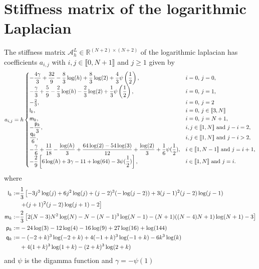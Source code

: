 \documentclass[11 pt]{article}
\newcommand\inter[1]{\llbracket #1\rrbracket}
\numberwithin{equation}{section}
\def\R{\mathbb{R}}
\begin{document}
\section{Stiffness matrix of the logarithmic Laplacian}\label{sec:s:m:log}

The stiffness matrix $\mathcal A_{h}^{L}\in{\R^{(N+2)\times(N+2)}}$ of the logarithmic laplacian has coefficients $a_{i,j}$ with $i,j\in\inter{0,N+1}$ and $j\geq 1$ given by
%
\begin{equation}
a_{i,j}= h
\begin{cases}
\displaystyle -\frac{4 \gamma }{3}+\frac{32 }{9}-\frac{8}{3}  \log (h)+\frac{8}{3}  \log
   (2)+\frac{4}{3}  \psi \left(\frac{1}{2}\right), & \textnormal{$i=0$, $j=0$,} \\ 
\displaystyle -\frac{\gamma }{3}+\frac{5}{9}-\frac{2}{3} \log (h)-\frac{2}{3}  \log
   (2)+\frac{1}{3} \psi \left(\frac{1}{2}\right), & \textnormal{$i=0$, $j=1$,} \\
   -\frac{2}{3}, 
 & \parbox[t]{.3\columnwidth}{$i=0$, $j=2$}\\
 \mathsf{l}_k, 
 & \parbox[t]{.3\columnwidth}{$i=0$, $j\in\inter{3,N}$}\\
 \mathsf{m}_k, &  \parbox[t]{.3\columnwidth}{$i=0$, $j=N+1$,}\\
\displaystyle -\frac{\mathsf p_k}{3}, & \textnormal{$i,j\in\inter{1,N}$ and $j-i=2$,} \\
\displaystyle \frac{\mathsf q_k}{6}, & \textnormal{$i,j\in\inter{1,N}$ and $j-i> 2$,} \\
\displaystyle -\frac{\gamma}{6} + \frac{11}{18} - \frac{\log(h)}{3}  + \frac{64\log(2) - 54\log(3)}{12} + \frac{\log(2)}{3}  + \frac{1}{6} \psi(\frac 12), & \textnormal{$i\in\inter{1,N-1}$ and $j=i+1$,} \\
\displaystyle -\frac{2}{9}\left[6\log(h) + 3\gamma - 11 + \log(64) - 3\psi(\frac12)\right], & \textnormal{$i\in\inter{1,N}$ and $j=i$.}
\end{cases}
\end{equation}
%
where 
%
\begin{align} \notag
\mathsf{l}_k:= & \frac{1}{3}  \left[-3 j^3 \log (j)+6 j^2 \log (j)+(j-2)^3 (-\log (j-2))+3
   (j-1)^2 (j-2) \log (j-1) \right. \\
   &\left. +(j+1)^2 (j-2) \log (j+1)-2\right] \\
   \mathsf{m}_k:= & \frac{2}{3}\left[2 (N-3) N^2 \log (N)-N-(N-1)^3 \log (N-1)-(N+1) ((N-4) N+1) \log (N+1)-3\right] \\
\mathsf{p}_k:=&  -24\log(3) - 12\log(4) - 16\log(9) + 27\log(16) + \log(144) \\ \notag
\mathsf{q}_k:=&-(-2 + k)^3\log(-2 + k) + 4(-1 + k)^3\log(-1 + k) - 6 k^3 \log(k)  \\
&+4(1 + k)^3\log(1 + k) - (2 + k)^3\log(2 + k)
\end{align}
and $\psi$ is the digamma function and $\gamma=-\psi(1)$
\end{document}

